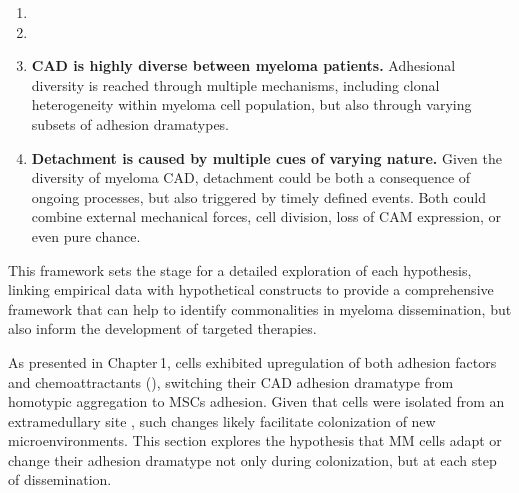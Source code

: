 \newcommand{\cadddiversity}{%
      \textbf{\ac{CAD} is highly diverse between myeloma patients.}
      Adhesional diversity is reached through multiple mechanisms, including
      clonal heterogeneity within myeloma cell population, but also through
      varying subsets of adhesion dramatypes. %
}%
\newcommand{\cadddiversitytitle}{ %
      \textit{Hypothesis 3}: CAD is Highly Diverse Between Myeloma Patients%
}%


\newcommand{\caddtrigger}{%
      \textbf{Detachment is caused by multiple cues of varying nature.} Given
      the diversity of myeloma \ac{CAD}, detachment could be both a consequence
      of ongoing processes, but also triggered by timely defined events. Both
      could combine external mechanical forces, cell division, loss
      of \ac{CAM} expression, or even pure chance. }%
\newcommand{\caddtriggertitle}{ %
      \textit{Hypothesis 4}: Detachment is Caused by Multiple Cues of Varying
      Nature %
}%





\begin{enumerate}[parsep=4pt]
      \item \caddramatype
      \item \cadplasticity
      \item \cadddiversity
      \item \caddtrigger
\end{enumerate}


This framework sets the stage for a detailed exploration of each hypothesis,
linking empirical data with hypothetical constructs to provide a comprehensive
framework that can help to identify commonalities in myeloma dissemination, but
also inform the development of targeted therapies.




\unnsubsection{\caddramatypetitle}%
\label{sec:discussion_caddadaptation}%
As presented in Chapter\,1, \MAina cells exhibited upregulation of both adhesion
factors and chemoattractants (), switching their \ac{CAD}
adhesion dramatype
from homotypic aggregation to \acp{MSC} adhesion. Given that \INA cells were
isolated from an extramedullary site 
\cite{burgerGp130RasMediated2001}, such changes likely facilitate colonization
of new microenvironments. This section explores the hypothesis that MM cells
adapt or change their adhesion dramatype not only during colonization, but at
each step of dissemination.


